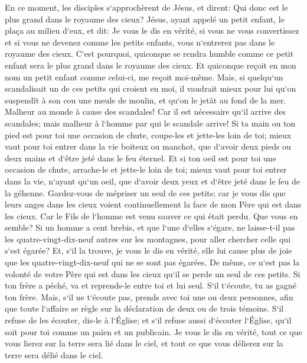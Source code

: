 \verse En ce moment, les disciples s`approchèrent de Jésus, et dirent: Qui donc est le plus grand dans le royaume des cieux? 
\verse Jésus, ayant appelé un petit enfant, le plaça au milieu d`eux, 
\verse et dit: Je vous le dis en vérité, si vous ne vous convertissez et si vous ne devenez comme les petits enfants, vous n`entrerez pas dans le royaume des cieux. 
\verse C`est pourquoi, quiconque se rendra humble comme ce petit enfant sera le plus grand dans le royaume des cieux. 
\verse Et quiconque reçoit en mon nom un petit enfant comme celui-ci, me reçoit moi-même. 
\verse Mais, si quelqu`un scandalisait un de ces petits qui croient en moi, il vaudrait mieux pour lui qu`on suspendît à son cou une meule de moulin, et qu`on le jetât au fond de la mer. 
\verse Malheur au monde à cause des scandales! Car il est nécessaire qu`il arrive des scandales; mais malheur à l`homme par qui le scandale arrive! 
\verse Si ta main ou ton pied est pour toi une occasion de chute, coupe-les et jette-les loin de toi; mieux vaut pour toi entrer dans la vie boiteux ou manchot, que d`avoir deux pieds ou deux mains et d`être jeté dans le feu éternel. 
\verse Et si ton oeil est pour toi une occasion de chute, arrache-le et jette-le loin de toi; mieux vaut pour toi entrer dans la vie, n`ayant qu`un oeil, que d`avoir deux yeux et d`être jeté dans le feu de la géhenne. 
\verse Gardez-vous de mépriser un seul de ces petits; car je vous dis que leurs anges dans les cieux voient continuellement la face de mon Père qui est dans les cieux. 
\verse Car le Fils de l`homme est venu sauver ce qui était perdu. 
\verse Que vous en semble? Si un homme a cent brebis, et que l`une d`elles s`égare, ne laisse-t-il pas les quatre-vingt-dix-neuf autres sur les montagnes, pour aller chercher celle qui s`est égarée? 
\verse Et, s`il la trouve, je vous le dis en vérité, elle lui cause plus de joie que les quatre-vingt-dix-neuf qui ne se sont pas égarées. 
\verse De même, ce n`est pas la volonté de votre Père qui est dans les cieux qu`il se perde un seul de ces petits. 
\verse Si ton frère a péché, va et reprends-le entre toi et lui seul. S`il t`écoute, tu as gagné ton frère. 
\verse Mais, s`il ne t`écoute pas, prends avec toi une ou deux personnes, afin que toute l`affaire se règle sur la déclaration de deux ou de trois témoins. 
\verse S`il refuse de les écouter, dis-le à l`Église; et s`il refuse aussi d`écouter l`Église, qu`il soit pour toi comme un païen et un publicain. 
\verse Je vous le dis en vérité, tout ce que vous lierez sur la terre sera lié dans le ciel, et tout ce que vous délierez sur la terre sera délié dans le ciel. 
